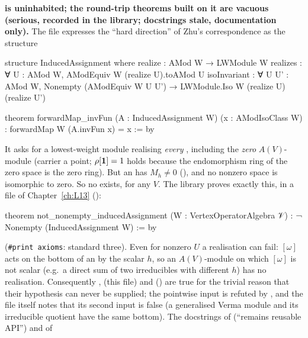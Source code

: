 \begin{warning}
\textbf{ is uninhabited; the round-trip theorems built on it are vacuous (serious, recorded in
the library; docstrings stale, documentation only).} The file  expresses
the ``hard direction'' of Zhu's correspondence as the structure
\begin{leancode}
structure InducedAssignment where
  realize : AMod W → LWModule W
  realizes : ∀ U : AMod W, AModEquiv W (realize U).toAMod U
  isoInvariant : ∀ U U' : AMod W, Nonempty (AModEquiv W U U') →
    LWModule.Iso W (realize U) (realize U')

theorem forwardMap_invFun (A : InducedAssignment W) (x : AModIsoClass W) :
    forwardMap W (A.invFun x) = x := by
\end{leancode}
It asks for a lowest-weight module realising \emph{every} , including the \emph{zero}
$A(V)$-module (carrier a point; $\rho[\mathbf{1}] = 1$ holds because the endomorphism ring of the zero space is the
zero ring). But an  has $M_h\neq0$ (), and no nonzero space is isomorphic to zero.
So no  exists, for any $V$. The library proves exactly this, in a file of
Chapter~\ref{ch:L13} ():
\begin{leancode}
theorem not_nonempty_inducedAssignment (W : VertexOperatorAlgebra 𝒱) :
    ¬ Nonempty (InducedAssignment W) := by
\end{leancode}
(\texttt{\#print axioms}: standard three). Even for nonzero $U$ a realisation can fail: $[\omega]$ acts on the bottom
of an  by the scalar $h$, so an $A(V)$-module on which $[\omega]$ is not scalar (e.g.\ a direct sum
of two irreducibles with different $h$) has no realisation. Consequently ,
\allowbreak{}\allowbreak{} (this file) and \allowbreak{}\allowbreak{}
() are true for the trivial reason that their
hypothesis can never be supplied; the pointwise input  is refuted by
\allowbreak{}\allowbreak{}, and the file  itself notes that its second
input  is false (a generalised Verma module and its irreducible quotient have the same bottom).
The docstrings of  (``remains reusable API'') and of 

\end{warning}
